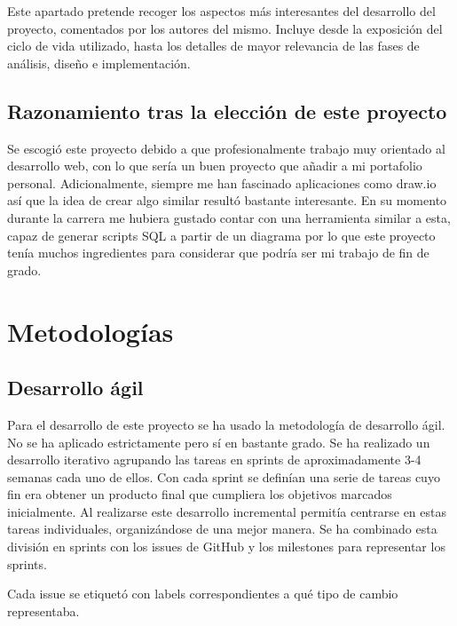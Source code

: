 
Este apartado pretende recoger los aspectos más interesantes del desarrollo del proyecto, comentados por los autores del mismo. Incluye desde la exposición del ciclo de vida utilizado, hasta los detalles de mayor relevancia de las fases de análisis, diseño e implementación.

\subsection{Razonamiento tras la elección de este proyecto}
Se escogió este proyecto debido a que profesionalmente trabajo muy orientado al desarrollo web, con lo que sería un buen proyecto que añadir a mi portafolio personal. Adicionalmente, siempre me han fascinado aplicaciones como draw.io así que la idea de crear algo similar resultó bastante interesante.
En su momento durante la carrera me hubiera gustado contar con una herramienta similar a esta, capaz de generar scripts SQL a partir de un diagrama por lo que este proyecto tenía muchos ingredientes para considerar que podría ser mi trabajo de fin de grado.

\section{Metodologías}
\subsection{Desarrollo ágil}
Para el desarrollo de este proyecto se ha usado la metodología de desarrollo ágil. No se ha aplicado estrictamente pero sí en bastante grado. Se ha realizado un desarrollo iterativo agrupando las tareas en sprints de aproximadamente 3-4 semanas cada uno de ellos.
Con cada sprint se definían una serie de tareas cuyo fin era obtener un producto final que cumpliera los objetivos marcados inicialmente. Al realizarse este desarrollo incremental permitía centrarse en estas tareas individuales, organizándose de una mejor manera.
Se ha combinado esta división en sprints con los issues de GitHub y los milestones para representar los sprints.


Cada issue se etiquetó con labels correspondientes a qué tipo de cambio representaba.


